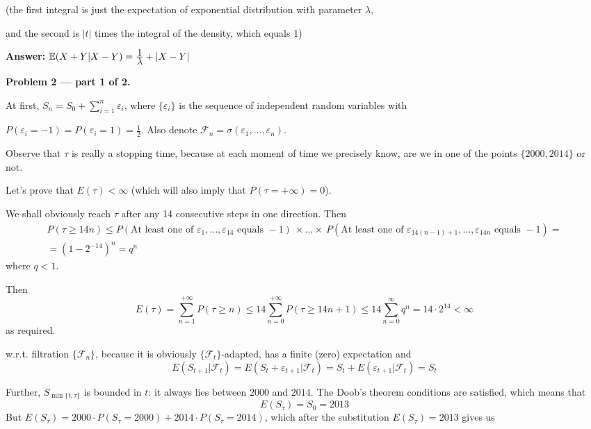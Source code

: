 \documentclass[12pt, a4paper]{article}
\newcommand{\cF}{\mathcal{F}}
\renewcommand{\FF}{\cF}
\renewcommand{\ee}{\varepsilon}
\newcommand{\ds}{\displaystyle}
\begin{document}
(the first integral is just the expectation of exponential distribution with parameter $\lambda$,\par and the second is $|t|$ times the integral of the density, which equals 1)\[\]\par
\textbf{Answer:} $\E(X+Y| X-Y) = \frac{\ds 1}{\ds \lambda} + |X-Y|$








\textbf{Problem 2 — part 1 of 2.}\par
At first, $S_{n} = S_{0}+\sum\limits_{i = 1}^{n}\ee_{i}$, where $\{\ee_{i}\}$ is the sequence of independent random variables with\par
 $P(\ee_{i} = -1) = P(\ee_{i} = 1) = \frac{\ds 1}{\ds 2}$. Also denote $\FF_{n} = \sigma(\ee_{1},\ldots,\ee_{n})$.\par
Observe that $\tau$ is really a stopping time, because at each moment of time we precisely know, are we in one of the points $\{2000, 2014\}$ or not.\par

Let's prove that $E(\tau) < \infty$ (which will also imply that $P(\tau = +\infty) = 0$).\par
We shall obviously reach $\tau$ after any 14 consecutive steps in one direction.
Then
\begin{multline}
P(\tau \geqslant 14n)\leqslant P(\mbox{At least one of }\ee_{1},\ldots ,\ee_{14}\mbox{ equals } -1)\ \times \ldots \times\  P(\mbox{At least one of }\ee_{14(n-1)+1},\ldots ,\ee_{14n}\mbox{ equals } -1) = \\
= \left(1 - 2^{-14}\right)^{n} = q^{n}
\end{multline}
where $q<1$.

Then
\[
E(\tau) = \sum\limits_{n = 1}^{+\infty}P(\tau \geqslant n) \leqslant 14\sum\limits_{n = 0}^{+\infty}P(\tau \geqslant 14n+1)\leqslant 14\sum\limits_{n = 0}^{\infty}q^{n} = 14\cdot 2^{14} < \infty
\]
as required.


 w.r.t. filtration $\{\FF_{n}\}$, because it is obviously $\{\FF_{t}\}$-adapted, has a finite (zero) expectation and
\[
E(S_{t+1}|\FF_{t}) = E(S_{t} + \ee_{t+1}|\FF_{t}) = S_{t} + E(\ee_{t+1}|\FF_{t}) = S_{t}
\]

Further, $S_{\min\{t, \tau\}}$ is bounded in $t$: it always lies between $2000$ and $2014$. The Doob's theorem conditions are satisfied, which means that
\[
E(S_{\tau}) = S_{0} = 2013
\]
But $E(S_{\tau}) = 2000\cdot P(S_{\tau} = 2000) + 2014\cdot P(S_{\tau} = 2014)$, which after the substitution $E(S_{\tau}) = 2013$ gives us
\end{document}
